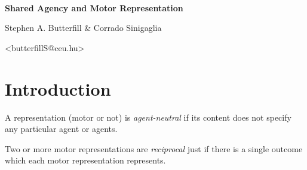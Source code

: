 \documentclass[11pt]{extarticle}
\date{}
\begin{document}
\begin{multicols}{3}

\setlength\footnotesep{1em}






\

\begin{center}
{\Large
\textbf{Shared Agency and Motor Representation}
}


Stephen A. Butterfill \& Corrado Sinigaglia

<butterfillS@ceu.hu>

\end{center}
%
%
%

\section{Introduction}
A representation (motor or not) is \emph{agent-neutral} if its content does not specify any particular agent or agents.


Two or more motor representations are \emph{reciprocal} just if there is a single outcome which each motor representation represents.


\end{multicols}
\end{document}
